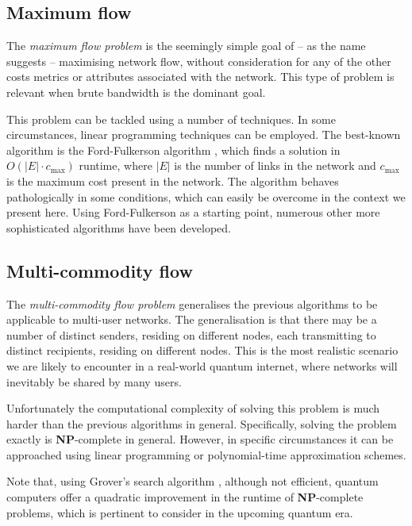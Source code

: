\documentclass[aps,rmp,twocolumn,amsmath,amssymb,nofootinbib,superscriptaddress]{revtex4}
\begin{document}
%
%

\subsection{Maximum flow} \label{sec:max_flow_prob}

The \emph{maximum flow problem} \cite{???} is the seemingly simple goal of -- as the name suggests -- maximising network flow, without consideration for any of the other costs metrics or attributes associated with the network. This type of problem is relevant when brute bandwidth is the dominant goal.

This problem can be tackled using a number of techniques. In some circumstances, linear programming techniques can be employed. The best-known algorithm is the Ford-Fulkerson algorithm \cite{???}, which finds a solution in \mbox{$O(|E|\cdot c_\mathrm{max})$} runtime, where $|E|$ is the number of links in the network and $c_\mathrm{max}$ is the maximum cost present in the network. The algorithm behaves pathologically in some conditions, which can easily be overcome in the context we present here. Using Ford-Fulkerson as a starting point, numerous other more sophisticated algorithms have been developed.

%
%

\subsection{Multi-commodity flow} \label{sec:multi_comm_flow}

The \emph{multi-commodity flow problem} \cite{???} generalises the previous algorithms to be applicable to multi-user networks. The generalisation is that there may be a number of distinct senders, residing on different nodes, each transmitting to distinct recipients, residing on different nodes. This is the most realistic scenario we are likely to encounter in a real-world quantum internet, where networks will inevitably be shared by many users.

Unfortunately the computational complexity of solving this problem is much harder than the previous algorithms in general. Specifically, solving the problem exactly is \textbf{NP}-complete in general. However, in specific circumstances it can be approached using linear programming or polynomial-time approximation schemes.

Note that, using Grover's search algorithm \cite{bib:Grover96}, although not efficient, quantum computers offer a quadratic improvement in the runtime of \textbf{NP}-complete problems, which is pertinent to consider in the upcoming quantum era.
\end{document}
